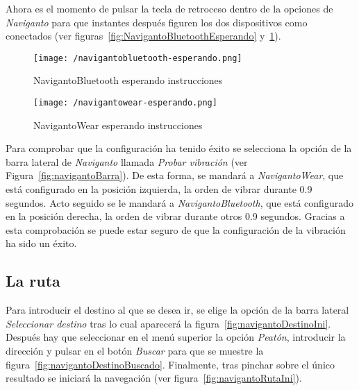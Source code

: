 Ahora es el momento de pulsar la tecla de retroceso dentro de la opciones de \emph{Naviganto} para
que instantes después figuren los dos dispositivos como conectados (ver
figuras~\ref{fig:NavigantoBluetoothEsperando} y~\ref{fig:NavigantowearEsperando}).

\begin{figure}[!h]
  \begin{minipage}[b]{0.5\linewidth}
    \begin{center}
      \texttt{[image: /navigantobluetooth-esperando.png]}
      \begin{minipage}[b]{0.9\linewidth}
        \caption{NavigantoBluetooth esperando instrucciones}
      \end{minipage}
      \label{fig:NavigantoBluetoothEsperando}
    \end{center}
  \end{minipage}
  \begin{minipage}[b]{0.5\linewidth}
    \begin{center}
      \texttt{[image: /navigantowear-esperando.png]}
      \begin{minipage}[b]{0.9\linewidth}
        \caption{NavigantoWear esperando instrucciones}
      \end{minipage}
      \label{fig:NavigantowearEsperando}
    \end{center}
  \end{minipage}
\end{figure}

Para comprobar que la configuración ha tenido éxito se selecciona la opción de la barra lateral de
\emph{Naviganto} llamada \emph{Probar vibración} (ver Figura~\ref{fig:navigantoBarra}). De esta
forma, se mandará a \emph{NavigantoWear}, que está configurado en la posición izquierda, la orden de
vibrar durante 0.9 segundos. Acto seguido se le mandará a \emph{NavigantoBluetooth}, que está
configurado en la posición derecha, la orden de vibrar durante otros 0.9 segundos. Gracias a esta
comprobación se puede estar seguro de que la configuración de la vibración ha sido un éxito.

\subsection{La ruta}

Para introducir el destino al que se desea ir, se elige la opción de la barra lateral
\emph{Seleccionar destino} tras lo cual aparecerá la figura~\ref{fig:navigantoDestinoIni}. Después
hay que seleccionar en el menú superior la opción \emph{Peatón}, introducir la dirección y pulsar en
el botón \emph{Buscar} para que se muestre la figura~\ref{fig:navigantoDestinoBuscado}. Finalmente,
tras pinchar sobre el único resultado se iniciará la navegación (ver
figura~\ref{fig:navigantoRutaIni}).

